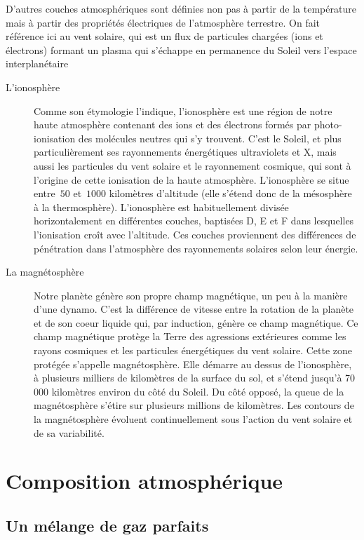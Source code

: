 \sk
\footnotesize
D'autres couches atmosphériques sont définies non pas à partir de la température mais à partir des propriétés électriques de l'atmosphère terrestre. On fait référence ici au vent solaire, qui est un flux de particules chargées (ions et électrons) formant un plasma qui s’échappe en permanence du Soleil vers l’espace interplanétaire
\begin{description}
\item[L'ionosphère] Comme son étymologie l'indique, l’ionosphère est une région de notre haute atmosphère contenant des ions et des électrons formés par photo-ionisation des molécules neutres qui s’y trouvent. C’est le Soleil, et plus particulièrement ses rayonnements énergétiques ultraviolets et X, mais aussi les particules du vent solaire et le rayonnement cosmique, qui sont à l’origine de cette ionisation de la haute atmosphère. L’ionosphère se situe entre~$50$ et~$1000$ kilomètres d’altitude (elle s'étend donc de la mésosphère à la thermosphère). L’ionosphère est habituellement divisée horizontalement en différentes couches, baptisées D, E et F dans lesquelles l’ionisation croît avec l’altitude. Ces couches proviennent des différences de pénétration dans l’atmosphère des rayonnements solaires selon leur énergie.
\item[La magnétosphère] Notre planète génère son propre champ magnétique, un peu à la manière d’une dynamo. C’est la différence de vitesse entre la rotation de la planète et de son coeur liquide qui, par induction, génère ce champ magnétique. Ce champ magnétique protège la Terre des agressions extérieures comme les rayons cosmiques et les particules énergétiques du vent solaire. Cette zone protégée s'appelle magnétosphère. Elle démarre au dessus de l’ionosphère, à plusieurs milliers de kilomètres de la surface du sol, et s’étend jusqu’à 70 000 kilomètres environ du côté du Soleil. Du côté opposé, la queue de la magnétosphère s’étire sur plusieurs millions de kilomètres. Les contours de la magnétosphère évoluent continuellement sous l’action du vent solaire et de sa variabilité.
\end{description}
\normalsize

\mk
\section{Composition atmosphérique}

\sk
\subsection{Un mélange de gaz parfaits}

